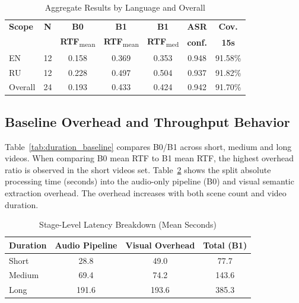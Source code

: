 ﻿﻿\documentclass[conference]{IEEEtran}
\begin{document}
\begin{table}[t]
\caption{Aggregate Results by Language and Overall}
\label{tab:lang_overall}
\centering
\footnotesize
\setlength{\tabcolsep}{4.2pt}
\begin{tabular}{lcccccc}
\toprule
\textbf{Scope} & \textbf{N} & \textbf{B0} & \textbf{B1} & \textbf{B1} & \textbf{ASR} & \textbf{Cov.} \\
 &  & \textbf{RTF}\textsubscript{mean} & \textbf{RTF}\textsubscript{mean} & \textbf{RTF}\textsubscript{med} & \textbf{conf.} & \textbf{15s} \\
\midrule
EN & 12 & 0.158 & 0.369 & 0.353 & 0.948 & 91.58\% \\
RU & 12 & 0.228 & 0.497 & 0.504 & 0.937 & 91.82\% \\
Overall & 24 & 0.193 & 0.433 & 0.424 & 0.942 & 91.70\% \\
\bottomrule
\end{tabular}
\end{table}

\subsection{Baseline Overhead and Throughput Behavior}
Table~\ref{tab:duration_baseline} compares B0/B1 across short, medium and long videos. When comparing B0 mean RTF to B1 mean RTF, the highest overhead ratio is observed in the short videos set. Table~\ref{tab:stage_latency} shows the split absolute processing time (seconds) into the audio-only pipeline (B0) and visual semantic extraction overhead. The overhead increases with both scene count and video duration.

\begin{table}[t]
\caption{Stage-Level Latency Breakdown (Mean Seconds)}
\label{tab:stage_latency}
\centering
\footnotesize
\setlength{\tabcolsep}{5pt}
\begin{tabular}{lccc}
\toprule
\textbf{Duration} & \textbf{Audio Pipeline} & \textbf{Visual Overhead} & \textbf{Total (B1)} \\
\midrule
Short & 28.8 & 49.0 & 77.7 \\
Medium & 69.4 & 74.2 & 143.6 \\
Long & 191.6 & 193.6 & 385.3 \\
\bottomrule
\end{tabular}
\end{table}
\end{document}
